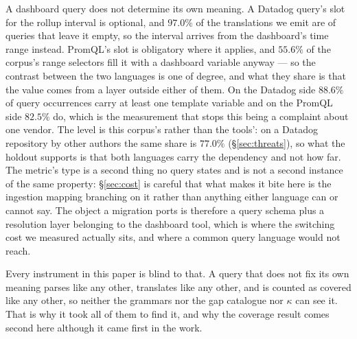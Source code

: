 A dashboard query does not determine its own meaning. A Datadog query's slot for the
rollup interval is optional, and $97.0\%$ of the translations we emit are of queries
that leave it empty, so the interval arrives from the dashboard's time range instead.
PromQL's slot is obligatory where it applies, and $55.6\%$ of the corpus's range
selectors fill it with a dashboard variable anyway --- so the contrast between the two
languages is one of degree, and what they share is that the value comes from a layer
outside either of them. On the Datadog side $88.6\%$ of query occurrences carry at least
one template variable and on the PromQL side $82.5\%$ do, which is the measurement
that stops this being a complaint about one vendor. The level is this corpus's rather
than the tools': on a Datadog repository by other authors the same share is $77.0\%$
(\S\ref{sec:threats}), so what the holdout supports is that both languages carry the
dependency and not how far. The metric's type is a second thing no
query states and is not a second instance of the same property:
\S\ref{sec:cost} is careful that what makes it bite here is the ingestion
mapping branching on it rather than anything either language can or cannot say. The
object a migration ports is therefore a query schema plus a resolution layer belonging
to the dashboard tool, which is where the switching cost we measured actually sits, and
where a common query language would not reach.

Every instrument in this paper is blind to that. A query that does not fix its own
meaning parses like any other, translates like any other, and is counted as covered like
any other, so neither the grammars nor the gap catalogue nor $\kappa$ can see it. That
is why it took all of them to find it, and why the coverage result comes second here
although it came first in the work.

